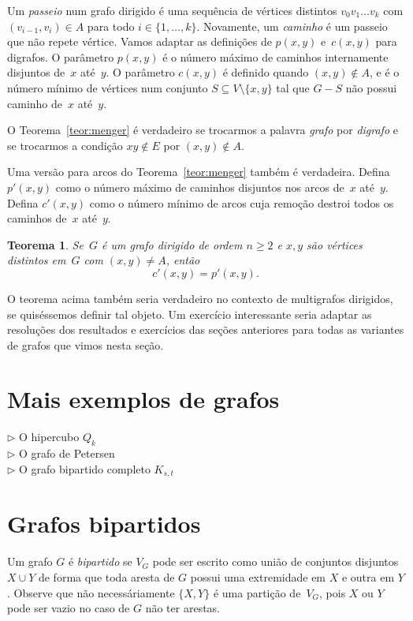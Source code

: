 \documentclass[12pt, a4paper]{article}
\newtheorem{teor}{Teorema}[section]
\theoremstyle{definition}
\begin{document}
Um \emph{passeio} num grafo dirigido é uma sequência de vértices distintos $v_0v_1 \dots v_k$ com $(v_{i-1},v_i) \in A$ para todo $i \in \{1,\dots,k\}$. Novamente, um \emph{caminho} é um passeio que não repete vértice. Vamos adaptar as definições de $p(x,y)$ e~$c(x,y)$ para digrafos. O parâmetro $p(x,y)$ é o número máximo de caminhos internamente disjuntos de~$x$ até~$y$. O parâmetro $c(x,y)$ é definido quando $(x,y) \not\in A$, e é o número mínimo de vértices num conjunto $S\subseteq V \setminus\{x,y\}$ tal que $G - S$ não possui caminho de~$x$ até~$y$.

O Teorema~\ref{teor:menger} é verdadeiro se trocarmos a palavra \emph{grafo} por \emph{digrafo} e se trocarmos a condição $xy \not\in E$ por $(x,y) \not\in A$. 

Uma versão para arcos do Teorema~\ref{teor:menger} também é verdadeira. Defina $p'(x,y)$ como o número máximo de caminhos disjuntos nos arcos de~$x$ até~$y$. Defina $c'(x,y)$ como o número mínimo de arcos cuja remoção destroi todos os caminhos de~$x$ até~$y$. 

\begin{teor}
  \label{teor:menger5}
  Se~$G$ é um grafo dirigido de ordem $n \geq 2$ e $x,y$ são vértices distintos em~$G$ com $(x,y) \neq A$, então
\begin{equation}
  \label{eq:min_max_conn2}
  c'(x,y) = p'(x,y).
\end{equation}
\end{teor}

O teorema acima também seria verdadeiro no contexto de multigrafos dirigidos, se quiséssemos definir tal objeto. Um exercício interessante seria adaptar as resoluções dos resultados e exercícios das seções anteriores para todas as variantes de grafos que vimos nesta seção.


\section{Mais exemplos de grafos}

$\rhd$ O hipercubo $Q_k$\\
$\rhd$ O grafo de Petersen\\
$\rhd$ O grafo bipartido completo $K_{s,t}$


\section {Grafos bipartidos}

Um grafo $G$ é \emph{bipartido} se $V_G$ pode ser escrito como união de conjuntos disjuntos $X \cup Y$ de forma que toda aresta de $G$ possui uma extremidade em $X$ e outra em $Y$. Observe que não necessáriamente $\{X,Y\}$ é uma partição de~$V_G$, pois $X$ ou $Y$ pode ser vazio no caso de $G$ não ter arestas.
\end{document}
